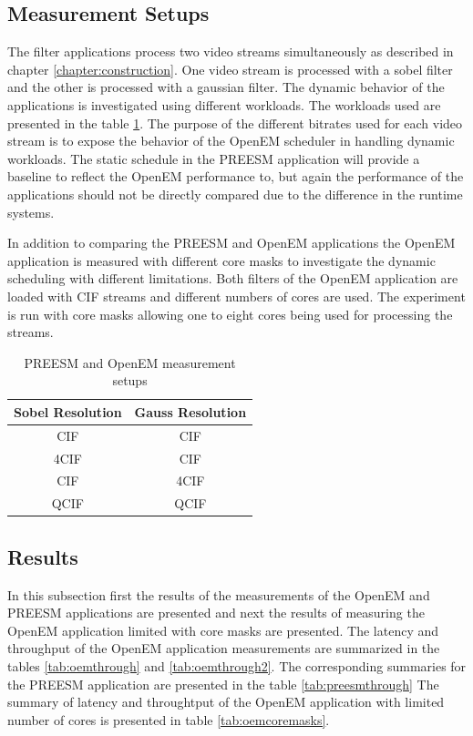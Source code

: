 \subsection{Measurement Setups}
The filter applications process two video streams simultaneously as described in
chapter \ref{chapter:construction}. One video stream is processed with a sobel
filter and the other is processed with a gaussian filter. The dynamic behavior
of the applications is investigated using different workloads. The workloads
used are presented in the table \ref{tab:preesm_setups}. The purpose of the
different bitrates used for each video stream is to expose the behavior of the
OpenEM scheduler in handling dynamic workloads. The static schedule in the
PREESM application will provide a baseline to reflect the OpenEM performance to,
but again the performance of the applications should not be directly compared
due to the difference in the runtime systems.

In addition to comparing the PREESM and OpenEM applications the OpenEM
application is measured with different core masks to investigate the dynamic
scheduling with different limitations. Both filters of the OpenEM application
are loaded with CIF streams and different numbers of cores are used. The
experiment is run with core masks allowing one to eight cores being used for
processing the streams.

\begin{table}
    \begin{center}
        \begin{tabular}{ c c }
            Sobel Resolution & Gauss Resolution \\ \hline
            CIF              & CIF              \\ \hline
            4CIF             & CIF              \\ \hline
            CIF              & 4CIF             \\ \hline
            QCIF             & QCIF             \\ \hline
        \end{tabular}
        \caption{PREESM and OpenEM measurement setups}
        \label{tab:preesm_setups}
    \end{center}
\end{table}

\subsection{Results}
In this subsection first the results of the measurements of the OpenEM and
PREESM applications are presented and next the results of measuring the OpenEM
application limited with core masks are presented. The latency and throughput of
the OpenEM application measurements are summarized in the tables
\ref{tab:oemthrough} and \ref{tab:oemthrough2}. The corresponding summaries for
the PREESM application are presented in the table \ref{tab:preesmthrough} The
summary of latency and throughtput of the OpenEM application with limited number
of cores is presented in table \ref{tab:oemcoremasks}.

